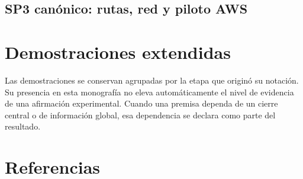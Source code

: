 \documentclass[12pt,a4paper]{article}
\begin{document}
\subsection{SP3 canónico: rutas, red y piloto AWS}






\clearpage
\section{Demostraciones extendidas}
\label{app:sp1-all-proofs}
\newcommand{\VIUFullSPsixProofs}{}

Las demostraciones se conservan agrupadas por la etapa que originó su notación. Su presencia en esta monografía no eleva automáticamente el nivel de evidencia de una afirmación experimental. Cuando una premisa dependa de un cierre central o de información global, esa dependencia se declara como parte del resultado.










\clearpage
\section{Referencias}
\printbibliography[heading=none]
\end{document}
